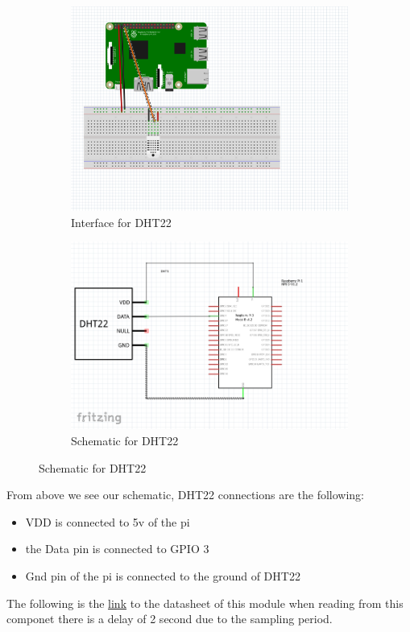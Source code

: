 \begin{figure}[h!]
	\centering
	\begin{subfigure}{0.4\textwidth}
		\includegraphics[width=\textwidth]{Images/InterfaceforDHT22.png}
		\caption{Interface for DHT22}
		\label{Interface for DHT22}
	\end{subfigure}
	\hfill
	\begin{subfigure}{0.4\textwidth}
		\includegraphics[width=\textwidth]{Images/schematicforDHT22.png}
		\caption{Schematic for DHT22}
		\label{Sychematic for DHT22 revised}
	\end{subfigure}
\end{figure}
From above we see our schematic, DHT22 connections are the following:
\begin{itemize}
	\item VDD is connected to 5v of the pi
	\item the Data pin is connected to GPIO 3
	\item Gnd pin  of the  pi is  connected to the ground  of DHT22 

\end{itemize}
\cite{sparkfun} The following is the \href{https://www.sparkfun.com/datasheets/Sensors/Temperature/DHT22.pdf}{link} to the datasheet of this module
when reading from this  componet there is  a  delay  of 2 second due to the  sampling period.

